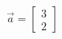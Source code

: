 \documentclass[preview]{standalone}
\begin{document}
\begin{align*}
\vec{a} = \begin{bmatrix} 3 \\ 2 \end{bmatrix}
\end{align*}
\end{document}
